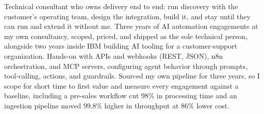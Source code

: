 \documentclass[11pt,a4paper,sans]{moderncv}
\begin{document}
\makecvtitle


\vspace{6pt}
\small{Technical consultant who owns delivery end to end: run discovery with the customer's operating team, design the integration, build it, and stay until they can run and extend it without me. Three years of AI automation engagements at my own consultancy, scoped, priced, and shipped as the sole technical person, alongside two years inside IBM building AI tooling for a customer-support organization. Hands-on with APIs and webhooks (REST, JSON), n8n orchestration, and MCP servers, configuring agent behavior through prompts, tool-calling, actions, and guardrails. Sourced my own pipeline for three years, so I scope for short time to first value and measure every engagement against a baseline, including a pre-sales workflow cut 98\% in processing time and an ingestion pipeline moved 99.8\% higher in throughput at 86\% lower cost.}

\end{document}
